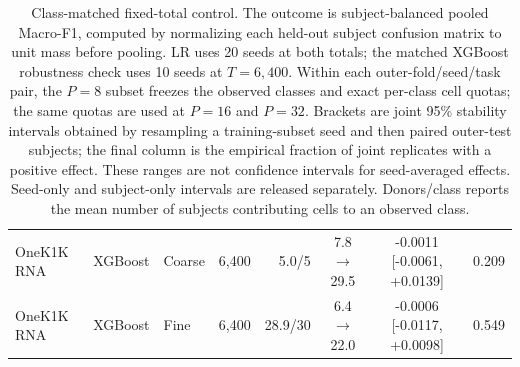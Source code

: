 \begin{table}[H]
{\begin{tabular}{lllrrccc}
OneK1K RNA & XGBoost & Coarse & 6,400 & 5.0/5 & 7.8$\rightarrow$29.5 & -0.0011 [-0.0061, +0.0139] & 0.209 \\
OneK1K RNA & XGBoost & Fine & 6,400 & 28.9/30 & 6.4$\rightarrow$22.0 & -0.0006 [-0.0117, +0.0098] & 0.549 \\
\bottomrule
\end{tabular}
}
\caption{Class-matched fixed-total control. The outcome is subject-balanced pooled Macro-F1, computed by normalizing each held-out subject confusion matrix to unit mass before pooling. LR uses 20 seeds at both totals; the matched XGBoost robustness check uses 10 seeds at $T=6{,}400$. Within each outer-fold/seed/task pair, the $P=8$ subset freezes the observed classes and exact per-class cell quotas; the same quotas are used at $P=16$ and $P=32$. Brackets are joint 95\% stability intervals obtained by resampling a training-subset seed and then paired outer-test subjects; the final column is the empirical fraction of joint replicates with a positive effect. These ranges are not confidence intervals for seed-averaged effects. Seed-only and subject-only intervals are released separately. Donors/class reports the mean number of subjects contributing cells to an observed class.}
\label{tab:class_matched_scaling}
\end{table}
